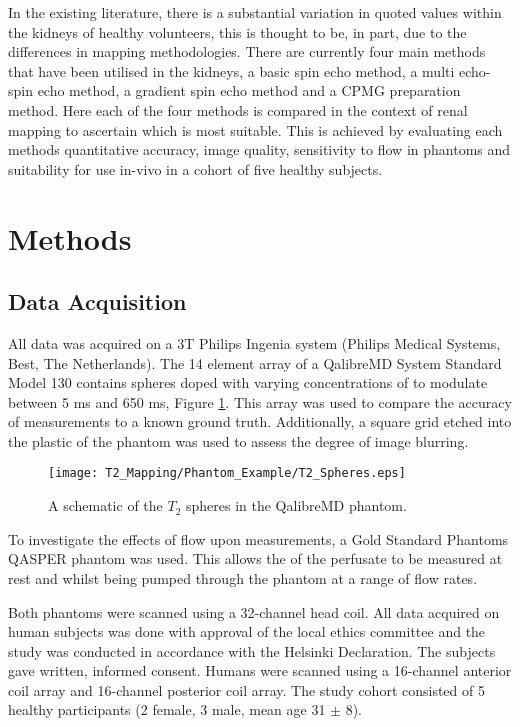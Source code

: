 In the existing literature, there is a substantial variation in quoted \ttwo values within the kidneys of healthy volunteers, this is thought to be, in part, due to the differences in \ttwo mapping methodologies. There are currently four main methods that have been utilised in the kidneys, a basic spin echo method, a multi echo-spin echo method, a gradient spin echo method and a \ac{CPMG} \ttwo preparation method. Here each of the four methods is compared in the context of renal \ttwo mapping to ascertain which is most suitable. This is achieved by evaluating each methods quantitative accuracy, image quality, sensitivity to flow in phantoms and suitability for use in-vivo in a cohort of five healthy subjects.

\newpage

\section{Methods}
\label{sec:t2_methods}

\subsection{Data Acquisition}
\label{subsec:t2_acq_schemes}

All data was acquired on a 3T Philips Ingenia system (Philips Medical Systems, Best, The Netherlands). The 14 element \ttwo array of a QalibreMD System Standard Model 130 contains spheres doped with varying concentrations of  to modulate \ttwo between 5 ms and 650 ms, Figure \ref{fig:t2_phantom_schematic}. This array was used to compare the accuracy of \ttwo measurements to a known ground truth. Additionally, a square grid etched into the plastic of the phantom was used to assess the degree of image blurring. 

\begin{figure}[H]
	\centering
	\texttt{[image: T2\_Mapping/Phantom\_Example/T2\_Spheres.eps]}
	\caption{A schematic of the $T_2$ spheres in the QalibreMD phantom.}
	\label{fig:t2_phantom_schematic}	
\end{figure}

To investigate the effects of flow upon \ttwo measurements, a Gold Standard Phantoms \ac{QASPER} phantom was used. This allows the \ttwo of the perfusate to be measured at rest and whilst being pumped through the phantom at a range of flow rates. 

Both phantoms were scanned using a 32-channel head coil. All data acquired on human subjects was done with approval of the local ethics committee and the study was conducted in accordance with the Helsinki Declaration. The subjects gave written, informed consent. Humans were scanned using a 16-channel anterior coil array and 16-channel posterior coil array. The study cohort consisted of 5 healthy participants (2 female, 3 male, mean age 31 $\pm$ 8).

